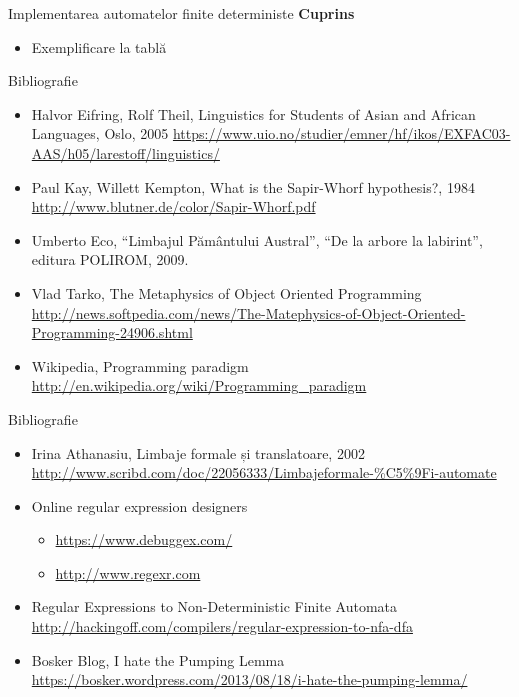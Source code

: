 \documentclass[pdf]{beamer}
\begin{document}



\begin{frame}{Implementarea automatelor finite deterministe}
\textbf{Cuprins}
\begin{itemize}
\item
Exemplificare la tablă
\end{itemize}
\end{frame}



\begin{frame}{Bibliografie}
\begin{itemize}
\item
Halvor Eifring, Rolf Theil, Linguistics for Students of Asian and African Languages, Oslo, 2005
\url{https://www.uio.no/studier/emner/hf/ikos/EXFAC03-AAS/h05/larestoff/linguistics/}
\item
Paul Kay, Willett Kempton, What is the Sapir-Whorf hypothesis?, 1984
\url{http://www.blutner.de/color/Sapir-Whorf.pdf}
\item
Umberto Eco, “Limbajul Pământului Austral”, “De la arbore la labirint”, editura POLIROM, 2009.
\item
Vlad Tarko, The Metaphysics of Object Oriented Programming
\url{http://news.softpedia.com/news/The-Matephysics-of-Object-Oriented-Programming-24906.shtml}
\item
Wikipedia, Programming paradigm
\url{http://en.wikipedia.org/wiki/Programming\_paradigm}
\end{itemize}
\end{frame}


\begin{frame}{Bibliografie}
\begin{itemize}
\item
Irina Athanasiu, Limbaje formale și translatoare, 2002
\url{http://www.scribd.com/doc/22056333/Limbajeformale-\%C5\%9Fi-automate}
\item
Online regular expression designers
\begin{itemize}
\item
\url{https://www.debuggex.com/}
\item
\url{http://www.regexr.com}
\end{itemize}
\item
Regular Expressions to Non-Deterministic Finite Automata
\url{http://hackingoff.com/compilers/regular-expression-to-nfa-dfa}
\item
Bosker Blog, I hate the Pumping Lemma
\url{https://bosker.wordpress.com/2013/08/18/i-hate-the-pumping-lemma/}
\end{itemize}
\end{frame}
\end{document}
